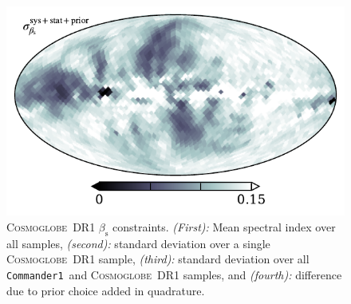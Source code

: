\documentclass[twocolumn]{../../common/aa}
\def\commanderone{\texttt{Commander1}}
\newcommand{\cosmoglobe}{\textsc{Cosmoglobe}}
\begin{document}
\begin{figure}
	\includegraphics[width=\columnwidth]{figures/beta_n0016_sd_stat_inst_prior.pdf}
	\caption{
		\cosmoglobe\ DR1 $\beta_\mathrm s$ constraints. \textit{(First):} Mean spectral index over all samples, \textit{(second):} standard deviation over a single \cosmoglobe\ DR1 sample, \textit{(third):} standard deviation over all \commanderone\ and \cosmoglobe\ DR1 samples, and \textit{(fourth):} difference due to prior choice added in quadrature.}
	\label{fig:beta_16}
\end{figure}
\end{document}
